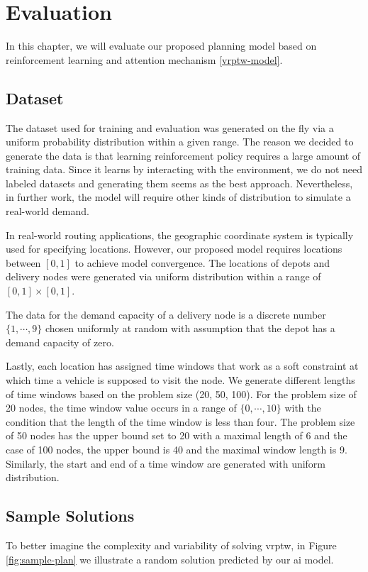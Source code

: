 \chapter{Evaluation}

In this chapter, we will evaluate our proposed planning model based on reinforcement learning and attention mechanism \ref{vrptw-model}.

\section{Dataset}
The dataset used for training and evaluation was generated on the fly via a uniform probability distribution within a given range. The reason we decided to generate the data is that learning reinforcement policy requires a large amount of training data. Since it learns by interacting with the environment, we do not need labeled datasets and generating them seems as the best approach. Nevertheless, in further work, the model will require other kinds of distribution to simulate a real-world demand.

In real-world routing applications, the geographic coordinate system is typically used for specifying locations. However, our proposed model requires locations between $[0, 1]$ to achieve model convergence. The locations of depots and delivery nodes were generated via uniform distribution within a range of $[0, 1] \times [0, 1]$.

The data for the demand capacity of a delivery node is a discrete number $\{1, \cdots, 9\}$ chosen uniformly at random with assumption that the depot has a demand capacity of zero. 

Lastly, each location has assigned time windows that work as a soft constraint at which time a vehicle is supposed to visit the node. We generate different lengths of time windows based on the problem size (20, 50, 100). For the problem size of 20 nodes, the time window value occurs in a range of $\{0, \cdots, 10\}$ with the condition that the length of the time window is less than four. The problem size of 50 nodes has the upper bound set to 20 with a maximal length of 6 and the case of 100 nodes, the upper bound is 40 and the maximal window length is 9. Similarly, the start and end of a time window are generated with uniform distribution.

\section{Sample Solutions}
To better imagine the complexity and variability of solving \gls{vrptw}, in Figure \ref{fig:sample-plan} we illustrate a random solution predicted by our \gls{ai} model.

